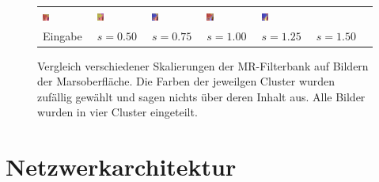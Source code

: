 \begin{figure}[h!]
\begin{tabular}{p{}p{}p{}p{}p{}p{}p{}}
		\includegraphics[width=0.15\textwidth]{images/gen/GEN_filterbanks_p03_04_MR_0.5.png} &
		\includegraphics[width=0.15\textwidth]{images/gen/GEN_filterbanks_p03_04_MR_0.75.png} &
		\includegraphics[width=0.15\textwidth]{images/gen/GEN_filterbanks_p03_04_MR_1.0.png} &
		\includegraphics[width=0.15\textwidth]{images/gen/GEN_filterbanks_p03_04_MR_1.25.png} &
		\includegraphics[width=0.15\textwidth]{images/gen/GEN_filterbanks_p03_04_MR_1.5.png} \\
		
		\centering Eingabe & 
		\centering $s=0.50$ &
		\centering $s=0.75$ &
		\centering $s=1.00$ &
		\centering $s=1.25$ &
		\centering $s=1.50$
	\end{tabular}
	\caption{Vergleich verschiedener Skalierungen der MR-Filterbank auf Bildern der Marsoberfläche. Die Farben der jeweilgen Cluster wurden zufällig gewählt und sagen nichts über deren Inhalt aus. Alle Bilder wurden in vier Cluster eingeteilt.}
	\label{fig:filterbank_sizes}
\end{figure}

\section{Netzwerkarchitektur}
\label{sec:networkarch}

